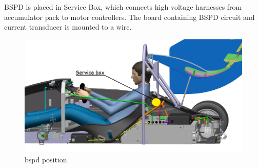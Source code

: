 BSPD is placed in Service Box, which connects high voltage harnesses from accumulator pack to motor controllers. The board containing BSPD circuit and current transducer is mounted to a wire.
\begin{figure}[H]
	\centering
	\includegraphics[width=\textwidth]{./img/ServiceBox-position.jpg}
	\caption{\gls{bspd} position}
	\label{fig:BSPD-position}
\end{figure}
